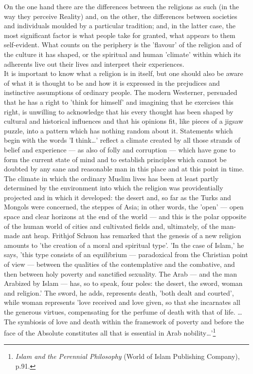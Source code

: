 \documentclass[10pt, twoside,openright]{book}
\begin{document}
On the one hand there are the differences between the religions as such (in the way they perceive Reality) and, on the other, the differences between societies and individuals moulded by a particular tradition; and, in the latter case, the most significant factor is what people take for granted, what appears to them self\hyp{}evident. What counts on the periphery is the 'flavour' of the religion and of the culture it has shaped, or the spiritual and human 'climate' within which its adherents live out their lives and interpret their experiences. \\

It is important to know what a religion is in itself, but one should also be aware of what it is thought to be and how it is expressed in the prejudices and instinctive assumptions of ordinary people. The modern Westerner, persuaded that he has a right to 'think for himself' and imagining that he exercises this right, is unwilling to acknowledge that his every thought has been shaped by cultural and historical influences and that his opinions fit, like pieces of a jigsaw puzzle, into a pattern which has nothing random about it. Statements which begin with the words 'I think\ldots{}' reflect a climate created by all those strands of belief and experience --- as also of folly and corruption --- which have gone to form the current state of mind and to establish principles which cannot be doubted by any sane and reasonable man in this place and at this point in time. \\

The climate in which the ordinary Muslim lives has been at least partly determined by the environment into which the religion was providentially projected and in which it developed: the desert and, so far as the Turks and Mongols were concerned, the steppes of Asia; in other words, the 'open' --- open space and clear horizons at the end of the world --- and this is the polar opposite of the human world of cities and cultivated fields and, ultimately, of the man\hyp{}made ant heap. Frithjof Schuon has remarked that the genesis of a new religion amounts to 'the creation of a moral and spiritual type'. 'In the case of Islam,' he says, 'this type consists of an equilibrium --- paradoxical from the Christian point of view --- between the qualities of the contemplative and the combative, and then between holy poverty and sanctified sexuality. The Arab --- and the man Arabized by Islam --- has, so to speak, four poles: the desert, the sword, woman and religion.' The sword, he adds, represents death, 'both dealt and courted', while woman represents 'love received and love given, so that she incarnates all the generous virtues, compensating for the perfume of death with that of life. \ldots{} The symbiosis of love and death within the framework of poverty and before the face of the Absolute constitutes all that is essential in Arab nobility\ldots{}'\footnote{\emph{Islam and the Perennial Philosophy} (World of Islam Publishing Company), p.91.}\\
\end{document}

